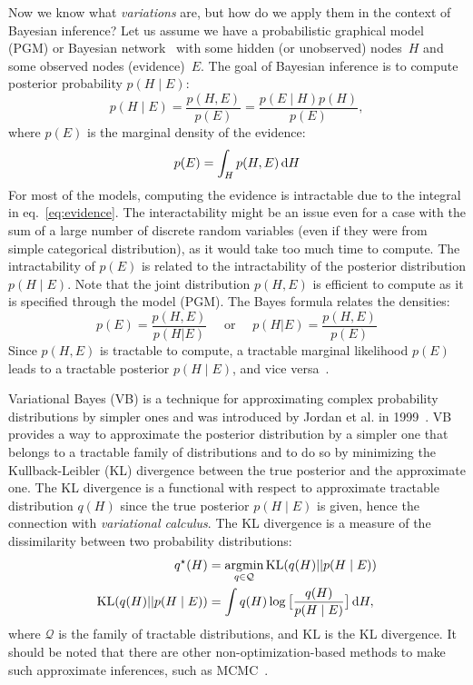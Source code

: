 Now we know what \textit{variations} are, but how do we apply them in the context of Bayesian inference? Let us assume we have a probabilistic
graphical model (PGM) or Bayesian network~\cite{graphical-models-2023} with some hidden (or unobserved) nodes~$H$ and some observed nodes (evidence)~$E$. The goal 
of Bayesian inference is to compute posterior probability $p(H\mid E)$:
$$
p(H \mid E) = \frac{p(H,E)}{p(E)} = \frac{p(E\mid H) p(H)}{p(E)},
$$ 
where $p(E)$ is the marginal density of the evidence:
\begin{equation}
    p(E) = \int_{H} p(H,E)\, \mbox{\rm d}H \label{eq:evidence}
\end{equation}
For most of the models, computing the evidence is intractable due to the integral in eq.~\ref{eq:evidence}. The interactability might be an issue even for a case with the sum of a large number of discrete random variables (even if they were from simple categorical distribution), as it would 
take too much time to compute. The intractability of $p(E)$ is related to the intractability of the posterior distribution $p(H \mid E)$. 
Note that the joint distribution $p(H, E)$ is efficient to compute as it is specified through the model (PGM). The Bayes formula relates the densities:
$$
p(E) = \frac{p(H,E)}{p(H|E)} \quad\text{ or }\quad p(H|E) = \frac{p(H,E)}{p(E)} 
$$
Since $p(H, E)$ is tractable to compute, a tractable marginal likelihood $p(E)$ leads to a tractable posterior $p(H \mid E)$, and
vice versa~\cite{intro-vae-2019,vb-intro-1999}.

Variational Bayes (VB) is a technique for approximating complex probability distributions by simpler ones and was introduced by Jordan et al. in 1999~\cite{vb-intro-1999}. 
VB provides a way to approximate the posterior distribution by a simpler one that belongs to a tractable family of distributions and to do so
by minimizing the Kullback-Leibler (KL) divergence between the true posterior and the approximate one. The KL divergence is a functional with respect to approximate tractable distribution $q(H)$ since the true posterior $p(H \mid E)$ is given, hence the connection with \textit{variational calculus}.  
The KL divergence is a measure of the dissimilarity between two probability distributions:
\begin{align*}
q^\star(H) &= \mathop{\rm argmin}_{q \in \mathcal{Q}} \mathrm{KL}(q(H) || p(H  \mid  E)) \\
\mathrm{KL}(q(H) || p(H \mid E)) &= \int q(H) \log \big[ \frac{q(H)}{p(H \mid E)} \big]\,\mbox{\rm d}H,
\end{align*}
where $\mathcal{Q}$ is the family of tractable distributions, and $\mathrm{KL}$ is the KL divergence. It should be noted that there are other 
non-optimization-based methods to make such approximate inferences, such as MCMC~\cite{wiki-mcmc-2023}.


